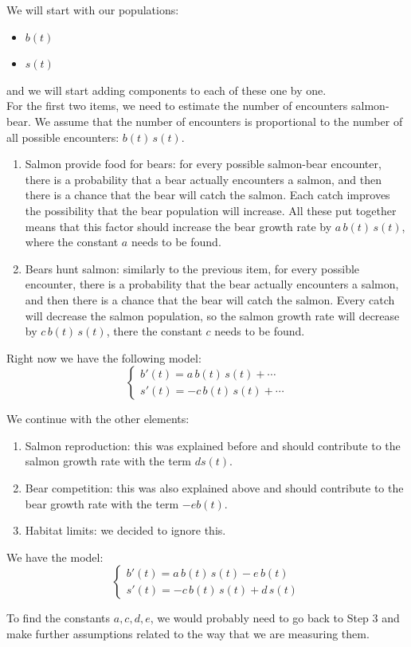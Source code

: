 \begin{example}
We will start with our populations:
\begin{itemize}
	\item $b(t)$
	\item $s(t)$
\end{itemize}
and we will start adding components to each of these one by one. \\

For the first two items, we need to estimate the number of encounters salmon-bear. We assume that the number of encounters is proportional to the number of all possible encounters: \emph{$b(t)\, s(t)$}.

\begin{enumerate}
	\item Salmon provide food for bears: for every possible salmon-bear encounter, there is a probability that a bear actually encounters a salmon, and then there is a chance that the bear will catch the salmon. Each catch improves the possibility that the bear population will increase. All these put together means that this factor should increase the bear growth rate by \emph{$a \,b(t)\, s(t)$}, where the constant $a$ needs to be found.
	\item Bears hunt salmon: similarly to the previous item, for every possible encounter, there is a probability that the bear actually encounters a salmon, and then there is a chance that the bear will catch the salmon. Every catch will decrease the salmon population, so the salmon growth rate will decrease by \emph{$c \,b(t) \,s(t)$}, there the constant $c$ needs to be found.
\end{enumerate}

Right now we have the following model:
$$
\begin{cases}
b'(t) = a \,b(t)\, s(t) + \cdots \\
s'(t) = - c \,b(t)\, s(t) + \cdots	
\end{cases}
$$

We continue with the other elements:
\begin{enumerate}[start=3]
	\item Salmon reproduction: this was explained before and should contribute to the salmon growth rate with the term \emph{$d s(t)$}.
	\item Bear competition: this was also explained above and should contribute to the bear growth rate with the term \emph{$-e b(t)$}.
	\item Habitat limits: we decided to ignore this.
\end{enumerate}

We have the model:
$$
\begin{cases}
b'(t) = a \, b(t) \,s(t) -e \, b(t) \\
s'(t) = - c \, b(t) \,s(t) + d \, s(t)
\end{cases}
$$

To find the constants $a,c,d,e$, we would probably need to go back to Step 3 and make further assumptions related to the way that we are measuring them.
\end{example}



